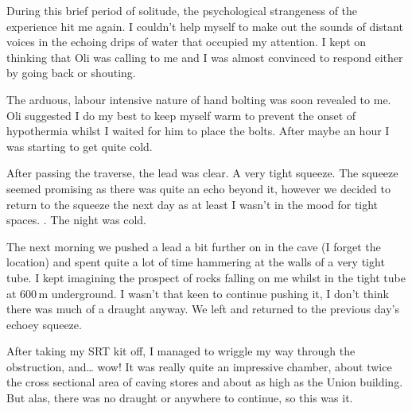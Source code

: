 During this brief period of solitude, the psychological strangeness of the experience hit me again. I couldn't help myself to make out the sounds of distant voices in the echoing drips of water that occupied my attention. I kept on thinking that Oli was calling to me and I was almost convinced to respond either by going back or shouting.

The arduous, labour intensive nature of hand bolting was soon revealed to me. Oli suggested I do my best to keep myself warm to prevent the onset of hypothermia whilst I waited for him to place the bolts. After maybe an hour I was starting to get quite cold. 

After passing the traverse, the lead was clear. A very tight squeeze. The squeeze seemed promising as there was quite an echo beyond it, however we decided to return to the squeeze the next day as at least I wasn’t in the mood for tight spaces. . The night was cold. 

The next morning we pushed a lead a bit further on in the cave (I forget the location)  and spent quite a lot of time hammering at the walls of a very tight tube. I kept imagining the prospect of rocks falling on me whilst in the tight tube at 600\,m underground. I wasn’t that keen to continue pushing it, I don’t think there was much of a draught anyway. We left and returned to the previous day’s echoey squeeze. 

After taking my SRT kit off, I managed to wriggle my way through the obstruction, and… wow! It was really quite an impressive chamber, about twice the cross sectional area of caving stores and about as high as the Union building. But alas, there was no draught or anywhere to continue, so this was it. 


